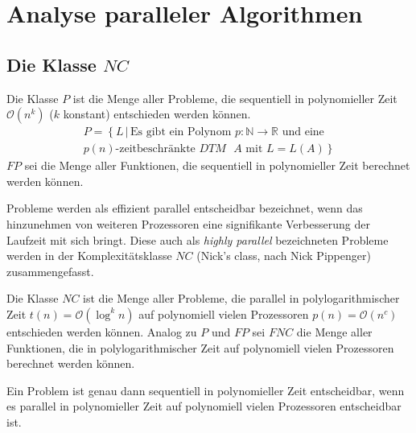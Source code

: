 \section{Analyse paralleler Algorithmen}

\subsection{Die Klasse $NC$}
\begin{define}
    Die Klasse $P$ ist die Menge aller Probleme, die sequentiell in 
    polynomieller Zeit $\mathcal{O}(n^k)$ ($k$ konstant) entschieden werden können.
    \begin{equation}
        \begin{split}
            P = \left\{ L \, | \, \text{Es gibt ein Polynom } p\colon \mathbb{N} \to \mathbb{R} \right.
            \text{ und eine} \\ \left. \text{$p(n)$-zeitbeschränkte $DTM$ $A$ mit } L = L(A) \right\}
        \end{split}
    \end{equation}
    $FP$ sei die Menge aller Funktionen, die sequentiell in polynomieller Zeit
    berechnet werden können.
    \cite[S.205]{fgi1}\cite[S.44f]{greenlaw}
\end{define}
%
Probleme werden als effizient parallel entscheidbar bezeichnet, wenn das
hinzunehmen von weiteren Prozessoren eine signifikante Verbesserung der
Laufzeit mit sich bringt.
Diese auch als \emph{highly parallel} bezeichneten Probleme werden in der
Komplexitätsklasse $NC$ (Nick's class, nach Nick Pippenger) zusammengefasst.
%
\begin{define}
    Die Klasse $NC$ ist die Menge aller Probleme, die parallel in
    polylogarithmischer Zeit $t(n) = \mathcal{O}(\log^k n)$ auf polynomiell
    vielen Prozessoren $p(n) = \mathcal{O}(n^c)$ entschieden werden können.
    Analog zu $P$ und $FP$ sei $FNC$ die Menge aller Funktionen, die in
    polylogarithmischer Zeit auf polynomiell vielen Prozessoren berechnet
    werden können.
    \cite[S.44f]{greenlaw}
\end{define}
%
\begin{lemma}
    Ein Problem ist genau dann sequentiell in polynomieller Zeit entscheidbar,
    wenn es parallel in polynomieller Zeit auf polynomiell vielen Prozessoren
    entscheidbar ist.\cite[S.44]{greenlaw}
    \label{seqiffpar}
\end{lemma}
